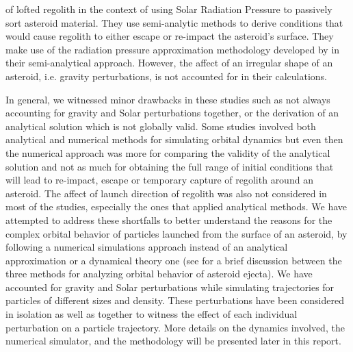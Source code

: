 of lofted regolith in the context of using Solar Radiation Pressure to passively sort asteroid material. They use semi-analytic methods to derive conditions that would cause regolith to either escape or re-impact the asteroid’s surface. They make use of the radiation pressure approximation methodology developed by \cite{richter1995stability} in their semi-analytical approach. However, the affect of an irregular shape of an asteroid, i.e. gravity perturbations, is not accounted for in their calculations.

In general, we witnessed minor drawbacks in these studies such as not always accounting for gravity and Solar perturbations together, or the derivation of an analytical solution which is not globally valid. Some studies involved both analytical and numerical methods for simulating orbital dynamics but even then the numerical approach was more for comparing the validity of the analytical solution and not as much for obtaining the full range of initial conditions that will lead to re-impact, escape or temporary capture of regolith around an asteroid. The affect of launch direction of regolith was also not considered in most of the studies, especially the ones that applied analytical methods. We have attempted to address these shortfalls to better understand the reasons for the complex orbital behavior of particles launched from the surface of an asteroid, by following a numerical simulations approach instead of an analytical approximation or a dynamical theory one (see \cite{scheeres2002fate} for a brief discussion between the three methods for analyzing orbital behavior of asteroid ejecta). We have accounted for gravity and Solar perturbations while simulating trajectories for particles of different sizes and density. These perturbations have been considered in isolation as well as together to witness the effect of each individual perturbation on a particle trajectory. More details on the dynamics involved, the numerical simulator, and the methodology will be presented later in this report.


